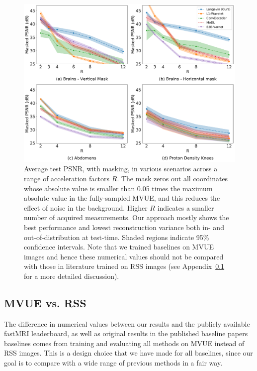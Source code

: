 \documentclass{article}
\begin{document}
\begin{figure}
    \centering
    \includegraphics[width=\columnwidth]{main-masked-psnr-comp.pdf}    \caption{\small Average test PSNR, with masking, in various scenarios across a range of acceleration factors $R$. The mask zeros out all coordinates whose absolute value is smaller than 0.05 times the maximum absolute value in the fully-sampled MVUE, and this reduces the effect of noise in the background. Higher $R$ indicates a smaller number of acquired measurements. Our approach mostly shows the best performance and lowest reconstruction variance both in- and out-of-distribution at test-time. Shaded regions indicate 95\% confidence intervals. Note that we trained baselines on MVUE images and hence these numerical values should not be compared with those in literature trained on RSS images (see Appendix~\ref{app:mvue-rss} for a more detailed discussion).}
    \label{fig:main-masked-psnr}
\end{figure}

\subsection{MVUE vs. RSS}\label{app:mvue-rss}
The difference in numerical values between our results and the publicly available fastMRI leaderboard, as well as original results in the published baseline papers baselines comes from training and evaluating all methods on MVUE instead of RSS images. This is a design choice that we have made for all baselines, since our goal is to compare with a wide range of previous methods in a fair way.
\end{document}
